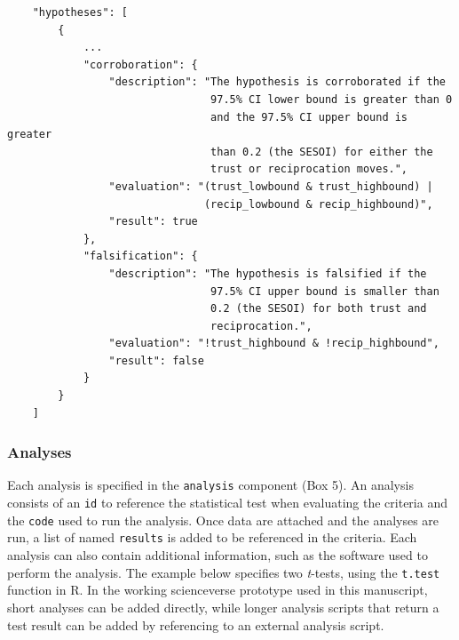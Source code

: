 \documentclass[english,doc,floatsintext]{apa6}
\begin{document}
\begin{tcolorbox}[colback=black!5!white,colframe=white!5!black,title=Box 4. Corroboration and falsification rules.]
\begin{verbatim}
    "hypotheses": [
        {
            ...
            "corroboration": {
                "description": "The hypothesis is corroborated if the
                                97.5% CI lower bound is greater than 0
                                and the 97.5% CI upper bound is greater
                                than 0.2 (the SESOI) for either the
                                trust or reciprocation moves.",
                "evaluation": "(trust_lowbound & trust_highbound) |
                               (recip_lowbound & recip_highbound)",
                "result": true
            },
            "falsification": {
                "description": "The hypothesis is falsified if the
                                97.5% CI upper bound is smaller than
                                0.2 (the SESOI) for both trust and
                                reciprocation.",
                "evaluation": "!trust_highbound & !recip_highbound",
                "result": false
            }
        }
    ]
\end{verbatim}
\end{tcolorbox}

\hypertarget{analyses}{%
\subsubsection{Analyses}\label{analyses}}

Each analysis is specified in the \texttt{analysis} component (Box 5). An analysis consists of an \texttt{id} to reference the statistical test when evaluating the criteria and the \texttt{code} used to run the analysis. Once data are attached and the analyses are run, a list of named \texttt{results} is added to be referenced in the criteria. Each analysis can also contain additional information, such as the software used to perform the analysis. The example below specifies two \emph{t}-tests, using the \texttt{t.test} function in R. In the working scienceverse prototype used in this manuscript, short analyses can be added directly, while longer analysis scripts that return a test result can be added by referencing to an external analysis script.
\end{document}
